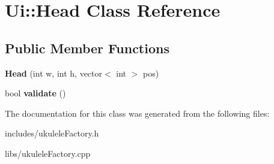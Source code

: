\hypertarget{class_ui_1_1_head}{}\section{Ui\+:\+:Head Class Reference}
\label{class_ui_1_1_head}
\subsection*{Public Member Functions}
\begin{DoxyCompactItemize}
\item 
\hypertarget{class_ui_1_1_head_a7d836a8ff096ec799372b05a19f6694e}{}\label{class_ui_1_1_head_a7d836a8ff096ec799372b05a19f6694e} 
{\bfseries Head} (int w, int h, vector$<$ int $>$ pos)
\item 
\hypertarget{class_ui_1_1_head_a0437a4142596636471d6ac877f38dbad}{}\label{class_ui_1_1_head_a0437a4142596636471d6ac877f38dbad} 
bool {\bfseries validate} ()
\end{DoxyCompactItemize}


The documentation for this class was generated from the following files\+:\begin{DoxyCompactItemize}
\item 
includes/ukulele\+Factory.\+h\item 
libs/ukulele\+Factory.\+cpp\end{DoxyCompactItemize}
